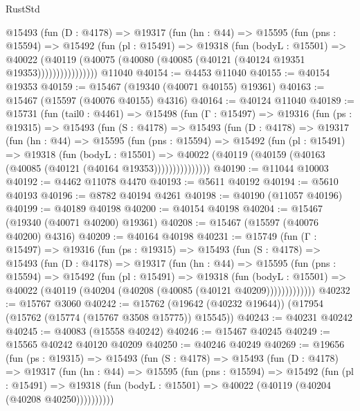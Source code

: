 \begin{lexlean}{RustStd}
\begin{coremodule}
            @15493
              (fun (D : @4178) =>
              @19317
                (fun (hn : @44) =>
                @15595
                  (fun (pns : @15594) =>
                  @15492
                    (fun (pl : @15491) =>
                    @19318
                      (fun (bodyL : @15501) =>
                      @40022
                        (@40119
                          (@40075 (@40080 (@40085 (@40121 (@40124 @19351 @19353))))))))))))))))
    @11040
@40154 := @4453 @11040
@40155 := @40154 @19353
@40159 := @15467 (@19340 (@40071 @40155) @19361)
@40163 := @15467 (@15597 (@40076 @40155) @4316)
@40164 := @40124 @11040
@40189 := @15731
    (fun (tail0 : @4461) =>
    @15498
      (fun (Γ : @15497) =>
      @19316
        (fun (ps : @19315) =>
        @15493
          (fun (S : @4178) =>
          @15493
            (fun (D : @4178) =>
            @19317
              (fun (hn : @44) =>
              @15595
                (fun (pns : @15594) =>
                @15492
                  (fun (pl : @15491) =>
                  @19318
                    (fun (bodyL : @15501) =>
                    @40022 (@40119 (@40159 (@40163 (@40085 (@40121 (@40164 @19353)))))))))))))))
@40190 := @11044 @10003
@40192 := @4462 @11078 @4470
@40193 := @5611 @40192
@40194 := @5610 @40193
@40196 := @8782 @40194 @4261
@40198 := @40190 (@11057 @40196)
@40199 := @40189 @40198
@40200 := @40154 @40198
@40204 := @15467 (@19340 (@40071 @40200) @19361)
@40208 := @15467 (@15597 (@40076 @40200) @4316)
@40209 := @40164 @40198
@40231 := @15749
    (fun (Γ : @15497) =>
    @19316
      (fun (ps : @19315) =>
      @15493
        (fun (S : @4178) =>
        @15493
          (fun (D : @4178) =>
          @19317
            (fun (hn : @44) =>
            @15595
              (fun (pns : @15594) =>
              @15492
                (fun (pl : @15491) =>
                @19318
                  (fun (bodyL : @15501) =>
                  @40022 (@40119 (@40204 (@40208 (@40085 (@40121 @40209)))))))))))))
@40232 := @15767 @3060
@40242 := @15762 (@19642 (@40232 @19644)) (@17954 (@15762 (@15774 (@15767 @3508 @15775)) @15545))
@40243 := @40231 @40242
@40245 := @40083 (@15558 @40242)
@40246 := @15467 @40245
@40249 := @15565 @40242 @40120 @40209
@40250 := @40246 @40249
@40269 := @19656
    (fun (ps : @19315) =>
    @15493
      (fun (S : @4178) =>
      @15493
        (fun (D : @4178) =>
        @19317
          (fun (hn : @44) =>
          @15595
            (fun (pns : @15594) =>
            @15492
              (fun (pl : @15491) =>
              @19318 (fun (bodyL : @15501) => @40022 (@40119 (@40204 (@40208 @40250))))))))))

\end{coremodule}
\end{lexlean}
